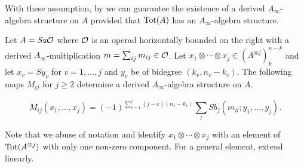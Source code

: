 \documentclass[join.tex]{subfiles}
\begin{document}
With these assumption, by  we can guarantee the existence of a derived $A_\infty$-algebra structure on $A$ provided that $\mathrm{Tot}(A)$ has an $A_\infty$-algebra structure.




\begin{thm}\label{derivedmaps}
Let $A=S\mathfrak{s}{\mathcal O}$ where ${\mathcal O}$ is an operad horizontally bounded on the right with a derived $A_\infty$-multiplication $m=\sum_{ij}m_{ij}\in{\mathcal O}$. Let $x_1\otimes\cdots\otimes x_j\in (A^{\otimes j})^{n-k}_k$ and let $x_v = Sy_v$ for $v=1,\dots, j$ and $y_v$ be of bidegree $(k_v,n_v-k_v)$. The following maps $M_{ij}$ for $j\geq 2$ determine a derived $A_\infty$-algebra structure on $A$.

\[M_{ij}(x_1,\dots,x_j)= (-1)^{\sum_{v=1}^j(j-v)(n_v-k_v)}\sum_lSb_j(m_{il};y_1,\dots, y_j). \]
\end{thm}
Note that we abuse of notation and identify $x_1\otimes\cdots\otimes x_j$ with an element of $\mathrm{Tot}(A^{\otimes j})$ with only one non-zero component. For a general element, extend linearly.
\end{document}
